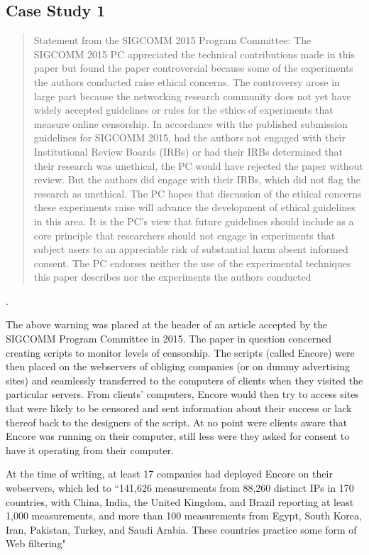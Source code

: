\documentclass{svjour3}                     %
\begin{document}
\subsection{Case Study 1}
\label{sec:case1}

\begin{quote}Statement from the SIGCOMM 2015 Program Committee: The SIGCOMM 2015 PC appreciated the technical contributions made in this paper but found the paper controversial because some of the experiments the authors conducted raise ethical concerns. The controversy arose in large part because the networking research community does not yet have widely accepted guidelines or rules for the ethics of experiments that measure online censorship. In accordance with the published submission guidelines for SIGCOMM 2015, had the authors not engaged with their Institutional Review Boards (IRBs) or had their IRBs determined that their research was unethical, the PC would have rejected the paper without review. But the authors did engage with their IRBs, which did not flag the research as unethical. The PC hopes that discussion of the ethical concerns these experiments raise will advance the development of ethical guidelines in this area. It is the PC’s view that future guidelines should include as a core principle that researchers should not engage in experiments that subject users to an appreciable risk of substantial harm absent informed consent. The PC endorses neither the use of the experimental techniques this paper describes nor the experiments the authors conducted
	\end{quote} \cite{burnett2015encore}.


The above warning was placed at the header of an article accepted by the SIGCOMM Program Committee in 2015.  The paper in question concerned creating scripts to monitor levels of censorship.  The scripts (called Encore) were then placed on the webservers of obliging companies (or on dummy advertising sites) and seamlessly transferred to the computers of clients when they visited the particular servers.  From clients' computers, Encore would then try to access sites that were likely to be censored and sent information about their success or lack thereof back to the designers of the script.  At no point were clients aware that Encore was running on their computer, still less were they asked for consent to have it operating from their computer.  

At the time of writing, at least 17 companies had deployed Encore on their webservers, which led to ``141,626 measurements from 88,260 distinct IPs in 170 countries, with China, India, the United Kingdom, and Brazil reporting at least 1,000 measurements, and more than 100 measurements from Egypt, South Korea, Iran, Pakistan, Turkey, and Saudi Arabia. These countries practice some form of Web filtering" \cite[p.~662]{burnett2015encore}
\end{document}
